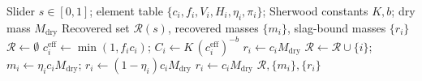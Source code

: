 \begin{algorithmic}[1]
\Require Slider $s\in[0,1]$; element table $\{c_i, f_i, V_i, H_i, \eta_i, \pi_i\}$; Sherwood constants $K, b$; dry mass $M_{\mathrm{dry}}$
\Ensure Recovered set $\mathcal{R}(s)$, recovered masses $\{m_i\}$, slag-bound masses $\{r_i\}$
\State $\mathcal{R} \gets \emptyset$
  \State $c^{\mathrm{eff}}_i \gets \min(1, f_i c_i)$; \quad $C_i \gets K\,(c^{\mathrm{eff}}_i)^{-b}$ 
    \State $r_i \gets c_i M_{\mathrm{dry}}$ 
    \State $\mathcal{R} \gets \mathcal{R}\cup\{i\}$; \quad $m_i \gets \eta_i c_i M_{\mathrm{dry}}$; \quad $r_i \gets (1-\eta_i)c_i M_{\mathrm{dry}}$
  \Else
    \State $r_i \gets c_i M_{\mathrm{dry}}$ 
  \EndIf
\EndFor
\State \Return $\mathcal{R}, \{m_i\}, \{r_i\}$ 
\end{algorithmic}
